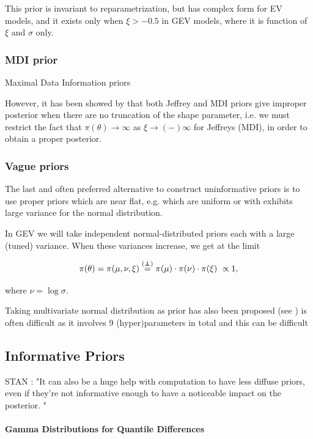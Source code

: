 \documentclass[11pt,a4paper,openany ]{book}
\newcommand\independent{\protect\mathpalette{\protect\independenT}{\perp}}
\def\independenT#1#2{\mathrel{\rlap{$#1#2$}\mkern2mu{#1#2}}}
\begin{document}
This prior is invariant to reparametrization, but has complex form for EV models, and it exists only when $\xi>-0.5$ in GEV models, where it is function of $\xi$ and $\sigma$ only.


\subsubsection*{MDI prior}
Maximal Data Information priors


However, it has been showed by \cite{northrop_posterior_2016} that 
both Jeffrey and MDI priors give improper posterior when there are no truncation of the shape parameter, i.e. we must restrict the fact that $\pi(\theta)\rightarrow\infty$ as $\xi\rightarrow(-)\infty$ for Jeffreys (MDI), in order to obtain a proper posterior.

\subsubsection*{Vague priors}
The last and often preferred alternative to construct uninformative priors is to use proper priors which are near flat, e.g. which are uniform or with exhibits large variance for the normal distribution.

In GEV we will take independent normal-distributed priors each with a large (tuned) variance. When these variances increase, we get at the limit

\begin{equation}
\pi(\theta)=\pi(\mu,\nu,\xi)\stackrel{(\independent)}{=}\pi(\mu)\cdot\pi(\nu)\cdot\pi(\xi)\ \propto 1,
\end{equation}

where $\nu= \log\sigma$.

Taking multivariate normal distribution as prior has also been proposed (see ) is often difficult as it involves 9 (hyper)parameters in total and this can be difficult 


\subsection{Informative Priors}

STAN : "It can
also be a huge help with computation to have less diffuse priors, even
if they're not informative enough to have a noticeable impact on the posterior. "

\paragraph*{Gamma Distributions for Quantile Differences}
\end{document}
